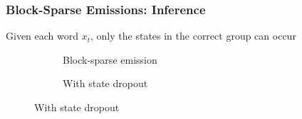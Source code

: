 \documentclass{beamer}
\begin{document}

\begin{frame}
\frametitle{Block-Sparse Emissions: Inference}

Given each word $x_t$, only the states in the correct group can occur
\vspace{1em} 

\begin{figure}
\captionsetup[subfigure]{justification=centering}
\begin{center}
\begin{subfigure}[t]{0.45\textwidth}
\centering
\resizebox{0.75\width}{0.75\height}{

}
\caption{Block-sparse emission}
\end{subfigure}
\begin{subfigure}[t]{0.45\textwidth}
\centering
\resizebox{0.75\width}{0.75\height}{

}
\caption{With state dropout}
\end{subfigure}
\end{center}
\end{figure}

\end{frame}
\end{document}
